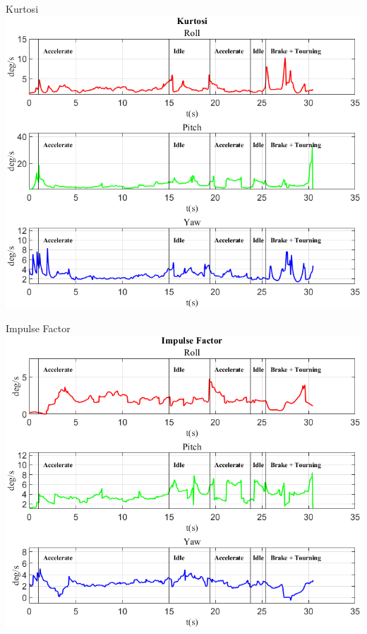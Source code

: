\documentclass[beamer]{standalone}
\begin{document}
	\begin{frame}{{Kurtosi}}
		\centering\includegraphics[height=.8\textheight]{figure/VAng/Kurtosi}
	\end{frame}
	
	
	
	
	\begin{frame}{{Impulse Factor}}
		\centering\includegraphics[height=.8\textheight]{figure/VAng/Impulse Factor}
	\end{frame}
	
\end{document}

